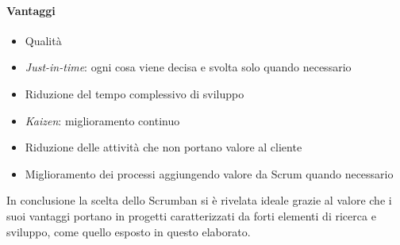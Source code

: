 \paragraph{Vantaggi}
\begin{itemize}
\item Qualità
\item \textit{Just-in-time}: ogni cosa viene decisa e svolta solo quando necessario
\item Riduzione del tempo complessivo di sviluppo
\item \textit{Kaizen}: miglioramento continuo
\item Riduzione delle attività che non portano valore al cliente
\item Miglioramento dei processi aggiungendo valore da Scrum quando necessario
\end{itemize}
In conclusione la scelta dello Scrumban si è rivelata ideale grazie al valore che i suoi vantaggi portano in progetti caratterizzati da forti elementi di ricerca e sviluppo, come quello esposto in questo elaborato. 